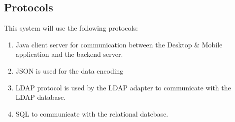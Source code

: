 \documentclass[letterpaper]{article}
\begin{document}
			\vspace{0.2in}
			\subsection*{Protocols}
			\vspace{0.1in}
		
			This system will use the following protocols:
			\begin{enumerate}
				\item Java client server for communication between the Desktop \& Mobile application and the backend server. 
				\item JSON is used for the data encoding 
				\item LDAP protocol is used by the LDAP adapter to communicate with the LDAP database.
				\item SQL to communicate with the relational datebase.
			\end{enumerate}
		
			\vspace{0.2in}
\end{document}

